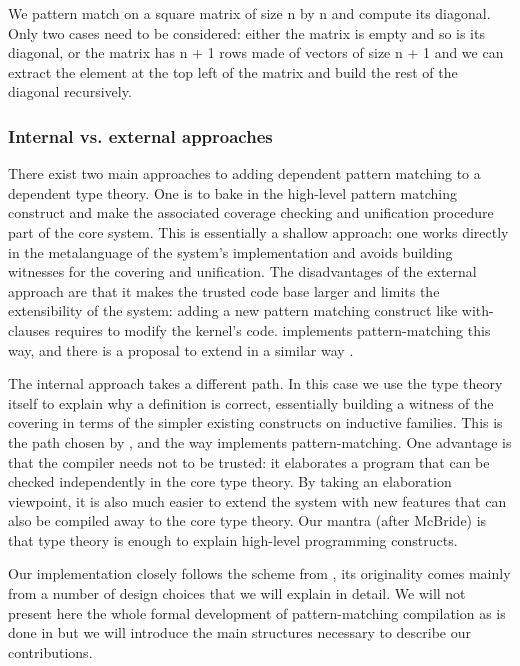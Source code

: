 We pattern match on a square matrix of size n by n and compute its
diagonal. Only two cases need to be considered: either the matrix is
empty and so is its diagonal, or the matrix has n + 1 rows made of
vectors of size n + 1 and we can extract the element at the top left of
the matrix and build the rest of the diagonal recursively.

\vspace{-1em}

\subsubsection{Internal vs. external approaches}
\label{sec:intern-vs.-extern}

There exist two main approaches to adding dependent pattern matching to
a dependent type theory. One is to bake in the high-level pattern
matching construct and make the associated coverage checking and 
unification procedure part of the core system. This is essentially a
shallow approach: one works directly in the metalanguage of the 
system's implementation and avoids building witnesses for the covering
and unification. The disadvantages of the external approach are that
it makes the trusted code base larger and limits the extensibility of 
the system: adding a new pattern matching construct like with-clauses 
requires to modify the kernel's code. \Agda implements pattern-matching
this way, and there is a proposal to extend \Coq in a similar way
\cite{conf/types/BarrasCGHS08}. 

The internal approach takes a different path. In this case we use the 
type theory itself to explain why a definition is correct,
essentially building a witness of the covering in terms of the 
simpler existing constructs on inductive families. This is the path 
chosen by \cite{DBLP:conf/birthday/GoguenMM06}, and the way \Epigram
implements pattern-matching. One advantage is that the compiler needs
not to be trusted: it elaborates a program that can be checked
independently in the core type theory. By taking an elaboration
viewpoint, it is also much easier to extend the system with new features
that can also be compiled away to the core type theory. Our 
mantra (after McBride) is that type theory is enough to explain
high-level programming constructs. 

Our implementation closely follows the scheme from
\cite{DBLP:conf/birthday/GoguenMM06}, its originality comes mainly from
a number of design choices that we will explain in detail.
We will not present here the whole formal development of pattern-matching
compilation as is done in \cite{DBLP:conf/birthday/GoguenMM06} but we
will introduce the main structures necessary to describe our
contributions.

